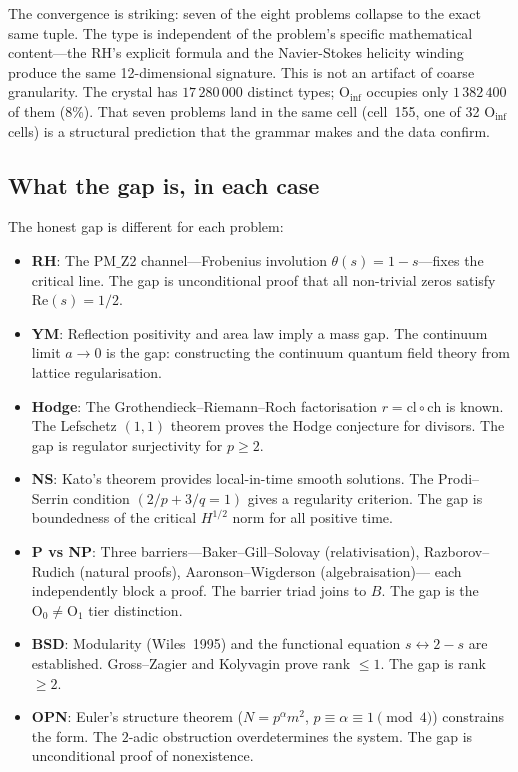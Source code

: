 \documentclass[11pt,a4paper]{article}
\theoremstyle{definition}
\begin{document}
The convergence is striking: seven of the eight problems collapse to the exact
same tuple. The type is independent of the problem's specific
mathematical content---the RH's explicit formula and the Navier-Stokes helicity
winding produce the same 12-dimensional signature. This is not an artifact of
coarse granularity. The crystal has $17\,280\,000$ distinct types; $\text{O}_{\text{inf}}$
occupies only $1\,382\,400$ of them (8\%). That seven problems land in the same
cell (cell~155, one of 32 $\text{O}_{\text{inf}}$ cells) is a structural
prediction that the grammar makes and the data confirm.

\subsection{What the gap is, in each case}

The honest gap is different for each problem:

\begin{itemize}
\item {\bf RH}: The $\text{PM\_Z2}$ channel---Frobenius involution
      $\theta(s) = 1 - s$---fixes the critical line. The gap is unconditional
      proof that all non-trivial zeros satisfy $\text{Re}(s) = 1/2$.

\item {\bf YM}: Reflection positivity and area law imply a mass gap. The
      continuum limit $a \to 0$ is the gap: constructing the continuum quantum
      field theory from lattice regularisation.

\item {\bf Hodge}: The Grothendieck--Riemann--Roch factorisation
      $r = \text{cl} \circ \text{ch}$ is known. The Lefschetz $(1,1)$ theorem
      proves the Hodge conjecture for divisors. The gap is regulator surjectivity
      for $p \ge 2$.

\item {\bf NS}: Kato's theorem provides local-in-time smooth solutions.
      The Prodi--Serrin condition $(2/p + 3/q = 1)$ gives a regularity
      criterion. The gap is boundedness of the critical $H^{1/2}$ norm for all
      positive time.

\item {\bf P vs NP}: Three barriers---Baker--Gill--Solovay (relativisation),
      Razborov--Rudich (natural proofs), Aaronson--Wigderson (algebraisation)---
      each independently block a proof. The barrier triad joins to $B$.
      The gap is the $\text{O}_0 \neq \text{O}_1$ tier distinction.

\item {\bf BSD}: Modularity (Wiles~1995) and the functional equation
      $s \leftrightarrow 2 - s$ are established. Gross--Zagier and Kolyvagin
      prove rank $\le 1$. The gap is rank $\ge 2$.

\item {\bf OPN}: Euler's structure theorem ($N = p^\alpha m^2$,
      $p \equiv \alpha \equiv 1 \pmod 4$) constrains the form. The $2$-adic
      obstruction overdetermines the system. The gap is unconditional proof
      of nonexistence.
\end{itemize}
\end{document}
